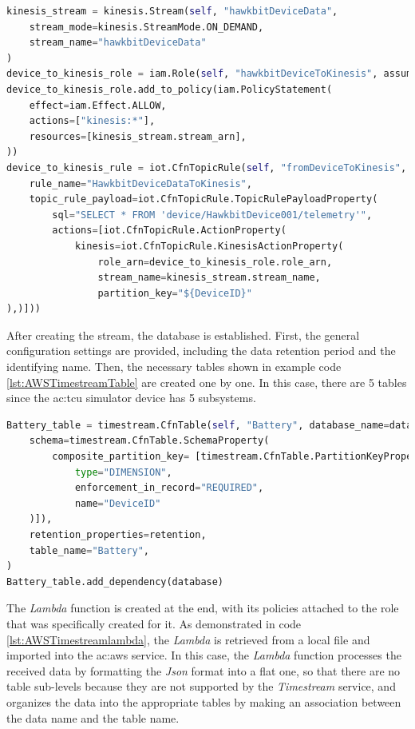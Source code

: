 \begin{lstlisting}[language=Python, caption={CDK code for the creation of the Kinesis stream with its role and rule}, label=lst:AWSKinesis]
kinesis_stream = kinesis.Stream(self, "hawkbitDeviceData",
    stream_mode=kinesis.StreamMode.ON_DEMAND,
    stream_name="hawkbitDeviceData"
)
device_to_kinesis_role = iam.Role(self, "hawkbitDeviceToKinesis", assumed_by=iam.ServicePrincipal("iot.amazonaws.com"),  role_name="hawkbitDeviceToKinesis")
device_to_kinesis_role.add_to_policy(iam.PolicyStatement(
    effect=iam.Effect.ALLOW,
    actions=["kinesis:*"],
    resources=[kinesis_stream.stream_arn],
))
device_to_kinesis_rule = iot.CfnTopicRule(self, "fromDeviceToKinesis",
    rule_name="HawkbitDeviceDataToKinesis",
    topic_rule_payload=iot.CfnTopicRule.TopicRulePayloadProperty(
        sql="SELECT * FROM 'device/HawkbitDevice001/telemetry'",
        actions=[iot.CfnTopicRule.ActionProperty(
            kinesis=iot.CfnTopicRule.KinesisActionProperty(
                role_arn=device_to_kinesis_role.role_arn,
                stream_name=kinesis_stream.stream_name,
                partition_key="${DeviceID}"
),)]))
\end{lstlisting}
After creating the stream, the database is established. First, the general configuration settings are provided, including the data retention period and the identifying name. Then, the necessary tables shown in example code \ref{lst:AWSTimestreamTable} are created one by one. In this case, there are 5 tables since the \gls{ac:tcu} simulator device has 5 subsystems.
\begin{lstlisting}[language=Python, caption={CDK code for the creation of the Battery table of the Timestream database}, label=lst:AWSTimestreamTable]
Battery_table = timestream.CfnTable(self, "Battery", database_name=database.database_name,
    schema=timestream.CfnTable.SchemaProperty(
        composite_partition_key= [timestream.CfnTable.PartitionKeyProperty(
            type="DIMENSION",
            enforcement_in_record="REQUIRED",
            name="DeviceID"
    )]),
    retention_properties=retention,
    table_name="Battery",
)
Battery_table.add_dependency(database)
\end{lstlisting}
The \textit{Lambda} function is created at the end, with its policies attached to the role that was specifically created for it. As demonstrated in code \ref{lst:AWSTimestreamlambda}, the \textit{Lambda} is retrieved from a local file and imported into the \gls{ac:aws} service. In this case, the \textit{Lambda} function processes the received data by formatting the \textit{Json} format into a flat one, so that there are no table sub-levels because they are not supported by the \textit{Timestream} service, and organizes the data into the appropriate tables by making an association between the data name and the table name.
